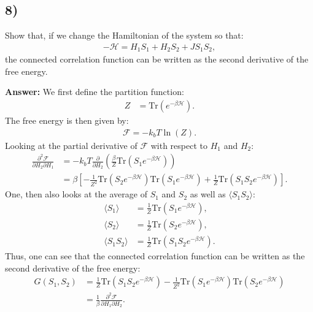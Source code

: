 \documentclass[a4paper]{article}
\newcommand{\trace}{\text{Tr}}
\newcommand{\newparagraph}{\vspace{.5cm}\noindent}
\newcommand{\average}[1]{\langle #1 \rangle}
\begin{document}
\subsection*{8)}
Show that, if we change the Hamiltonian of the system so that:
\begin{align*}
    -\mathcal{H} = H_1S_1 + H_2S_2 + JS_1S_2,
\end{align*}the connected correlation function can be written as the second derivative of the free energy.

\newparagraph
\textbf{Answer:} We first define the partition function:
\begin{align*}
    Z &= \trace \left(e^{-\beta \mathcal{H}}\right).
\end{align*}The free energy is then given by:
\begin{align*}
    \mathcal{F} = -k_b T\ln(Z).
\end{align*}Looking at the partial derivative of $\mathcal{F}$ with respect to $H_1$ and $H_2$:
\begin{align*}
    \frac{\partial^2 \mathcal{F}}{\partial H_2 \partial H_1} &= -k_bT\frac{\partial}{\partial H_2}\left(\frac{\beta}{Z}\trace\left(S_1e^{-\beta\mathcal{H}}\right)\right)\\
    &= \beta\left[-\frac{1}{Z^2}\trace\left(S_2e^{-\beta \mathcal{H}}\right)\trace\left(S_1e^{-\beta\mathcal{H}}\right) + \frac{1}{Z}\trace\left(S_1S_2e^{-\beta\mathcal{H}}\right)\right].
\end{align*}One, then also looks at the average of $S_1$ and $S_2$ as well as $\average{S_1S_2}$:
\begin{align*}
    \average{S_1} &= \frac{1}{Z}\trace\left(S_1e^{-\beta\mathcal{H}}\right),\\
    \average{S_2} &= \frac{1}{Z}\trace\left(S_2e^{-\beta\mathcal{H}}\right),\\
    \average{S_1S_2} &= \frac{1}{Z}\trace\left(S_1S_2e^{-\beta\mathcal{H}}\right).
\end{align*}Thus, one can see that the connected correlation function can be written as the second derivative of the free energy:
\begin{align*}
    G(S_1, S_2) &= \frac{1}{Z}\trace\left(S_1S_2e^{-\beta\mathcal{H}}\right) - \frac{1}{Z^2}\trace\left(S_1e^{-\beta\mathcal{H}}\right)\trace\left(S_2e^{-\beta\mathcal{H}}\right)\\
    &= \frac{1}{\beta}\frac{\partial^2\mathcal{F}}{\partial H_1\partial H_2}.
\end{align*}
\end{document}
